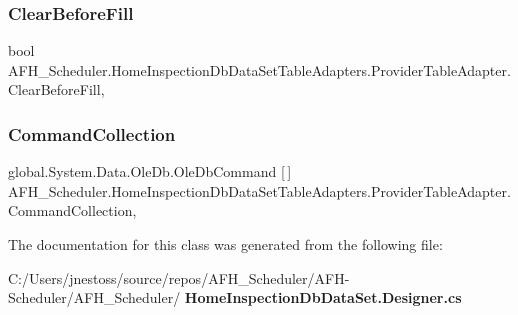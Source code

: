 \subsubsection{ClearBeforeFill}
{\footnotesize\ttfamily bool A\+F\+H\+\_\+\+Scheduler.\+Home\+Inspection\+Db\+Data\+Set\+Table\+Adapters.\+Provider\+Table\+Adapter.\+Clear\+Before\+Fill\hspace{0.3cm}{\ttfamily [get]}, {\ttfamily [set]}}

\mbox{\label{class_a_f_h___scheduler_1_1_home_inspection_db_data_set_table_adapters_1_1_provider_table_adapter_adae3c64e176e3f7093b0bb331cecda1c}} 
\subsubsection{CommandCollection}
{\footnotesize\ttfamily global.\+System.\+Data.\+Ole\+Db.\+Ole\+Db\+Command [$\,$] A\+F\+H\+\_\+\+Scheduler.\+Home\+Inspection\+Db\+Data\+Set\+Table\+Adapters.\+Provider\+Table\+Adapter.\+Command\+Collection\hspace{0.3cm}{\ttfamily [get]}, {\ttfamily [protected]}}



The documentation for this class was generated from the following file\+:\begin{DoxyCompactItemize}
\item 
C\+:/\+Users/jnestoss/source/repos/\+A\+F\+H\+\_\+\+Scheduler/\+A\+F\+H-\/\+Scheduler/\+A\+F\+H\+\_\+\+Scheduler/\textbf{ Home\+Inspection\+Db\+Data\+Set.\+Designer.\+cs}\end{DoxyCompactItemize}
